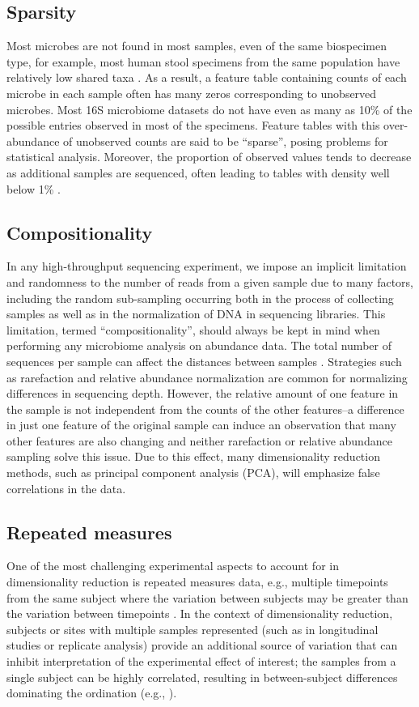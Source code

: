 \subsection{Sparsity} Most microbes are not found in most samples, even of the same biospecimen type, for example, most human stool specimens from the same population have relatively low shared taxa \cite{Allaband2019-rv}. As a result, a feature table containing counts of each microbe in each sample often has many zeros corresponding to unobserved microbes. Most 16S microbiome datasets do not have even as many as 10\% of the possible entries observed in most of the specimens. Feature tables with this over-abundance of unobserved counts are said to be “sparse”, posing problems for statistical analysis. Moreover, the proportion of observed values tends to decrease as additional samples are sequenced, often leading to tables with density well below 1\% \cite{Hamady2009-jd,McDonald2012-go}.

\subsection{Compositionality} In any high-throughput sequencing experiment, we impose an implicit limitation and randomness to the number of reads from a given sample due to many factors, including the random sub-sampling occurring both in the process of collecting samples as well as in the normalization of DNA in sequencing libraries. This limitation, termed “compositionality”, should always be kept in mind when performing any microbiome analysis on abundance data. The total number of sequences per sample can affect the distances between samples \cite{Weiss2017-iv}. Strategies such as rarefaction and relative abundance normalization are common for normalizing differences in sequencing depth. However, the relative amount of one feature in the sample is not independent from the counts of the other features–a difference in just one feature of the original sample can induce an observation that many other features are also changing \cite{Morton2019-me} and neither rarefaction or relative abundance sampling solve this issue. Due to this effect, many dimensionality reduction methods, such as principal component analysis (PCA), will emphasize false correlations in the data.

\subsection{Repeated measures} One of the most challenging experimental aspects to account for in dimensionality reduction is repeated measures data, e.g., multiple timepoints from the same subject where the variation between subjects may be greater than the variation between timepoints \cite{Wu2011-py}. In the context of dimensionality reduction, subjects or sites with multiple samples represented (such as in longitudinal studies or replicate analysis) provide an additional source of variation that can inhibit interpretation of the experimental effect of interest; the samples from a single subject can be highly correlated, resulting in between-subject differences dominating the ordination (e.g., \cite{Song2016-wt}). 

